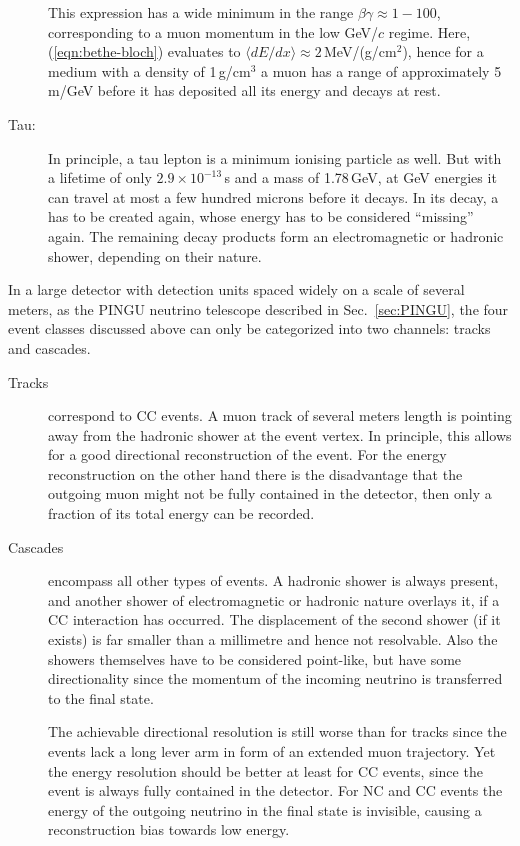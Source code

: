 \begin{description}
  This expression has a wide minimum in the range $\beta\gamma\approx 1 - 100$, 
  corresponding to a muon momentum in the low GeV/$c$ regime. Here,
  (\ref{eqn:bethe-bloch}) evaluates to $\langle dE/dx\rangle \approx
  2$\,MeV/(g/cm$^2$), hence for a medium with a density of 1\,g/cm$^3$ a muon
  has a range of approximately 5\,m/GeV before it has deposited all its energy
  and decays at rest.
 \item[Tau:] In principle, a tau lepton is a minimum ionising particle as well.
  But with a lifetime of only $2.9\times10^{-13}$\,s and a mass of 1.78\,GeV, at
  GeV energies it can travel at most a few hundred microns before it decays. In
  its decay, a \nutau has to be created again, whose energy has to be considered
  ``missing'' again. The remaining decay products form an electromagnetic or
  hadronic shower, depending on their nature.
\end{description}

In a large detector with detection units spaced widely on a scale of several 
meters, as the PINGU neutrino telescope described in Sec.~\ref{sec:PINGU}, the 
four event classes discussed above can only be categorized into two channels: 
tracks and cascades. 
\begin{description}
 \item[Tracks] correspond to \numu CC events. A muon track of several meters 
  length is pointing away from the hadronic shower at the event vertex. In 
  principle, this allows for a good directional reconstruction of the event. 
  For the energy reconstruction on the other hand there is the disadvantage 
  that the outgoing muon might not be fully contained in the detector, then 
  only a fraction of its total energy can be recorded.
 \item[Cascades] encompass all other types of events. A hadronic shower is 
  always present, and another shower of electromagnetic or hadronic nature 
  overlays it, if a CC interaction has occurred. The displacement of the second 
  shower (if it exists) is far smaller than a millimetre and hence not 
  resolvable. Also the showers themselves have to be considered point-like, but 
  have some directionality since the momentum of the incoming neutrino is 
  transferred to the final state. 
  
  The achievable directional resolution is still worse than for tracks since 
  the events lack a long lever arm in form of an extended muon trajectory. Yet 
  the energy resolution should be better at least for \nue CC events, since the 
  event is always fully contained in the detector. For NC and \nutau CC events 
  the energy of the outgoing neutrino in the final state is invisible, causing 
  a reconstruction bias towards low energy.
\end{description}


